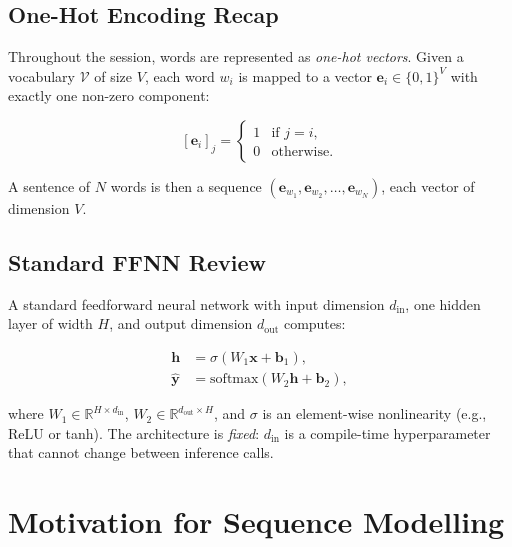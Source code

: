 \documentclass[12pt,a4paper]{article}
\begin{document}
\subsection{One-Hot Encoding Recap}
\label{subsec:onehot}

Throughout the session, words are represented as \emph{one-hot vectors}.
Given a vocabulary $\mathcal{V}$ of size $V$, each word $w_i$ is mapped to a
vector $\mathbf{e}_i \in \{0,1\}^{V}$ with exactly one non-zero component:

\begin{equation}
  \label{eq:onehot}
  [\mathbf{e}_i]_j =
  \begin{cases}
    1 & \text{if } j = i, \\
    0 & \text{otherwise.}
  \end{cases}
\end{equation}

A sentence of $N$ words is then a sequence
$(\mathbf{e}_{w_1}, \mathbf{e}_{w_2}, \ldots, \mathbf{e}_{w_N})$, each
vector of dimension $V$.

\subsection{Standard FFNN Review}
\label{subsec:ffnn_review}

A standard feedforward neural network with input dimension $d_{\text{in}}$,
one hidden layer of width $H$, and output dimension $d_{\text{out}}$ computes:

\begin{align}
  \label{eq:ffnn_hidden}
  \mathbf{h} &= \sigma\!\left(W_1 \mathbf{x} + \mathbf{b}_1\right), \\
  \label{eq:ffnn_output}
  \hat{\mathbf{y}} &= \text{softmax}\!\left(W_2 \mathbf{h} + \mathbf{b}_2\right),
\end{align}

where $W_1 \in \mathbb{R}^{H \times d_{\text{in}}}$,
$W_2 \in \mathbb{R}^{d_{\text{out}} \times H}$, and $\sigma$ is an
element-wise nonlinearity (e.g., ReLU or tanh).  The architecture is
\emph{fixed}: $d_{\text{in}}$ is a compile-time hyperparameter that cannot
change between inference calls.

\section{Motivation for Sequence Modelling}
\label{sec:motivation}
\end{document}
